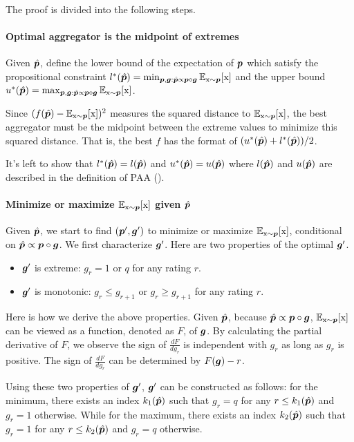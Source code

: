 
The proof is divided into the following steps. 

\paragraph{Optimal aggregator is the midpoint of extremes} Given $\hat{{\bm{p}}}$, define the lower bound of the expectation of ${\bm{p}}$ which satisfy the propositional constraint $l^*(\hat{{\bm{p}}})=\min_{{\bm{p}},{\bm{g}}:\hat{{\bm{p}}}\propto {\bm{p}}\circ{\bm{g}}}\mathbb{E}_{{\textnormal{x}}\sim{\bm{p}}}[{\textnormal{x}}]$ and the upper bound $u^*(\hat{{\bm{p}}})=\max_{{\bm{p}},{\bm{g}}:\hat{{\bm{p}}}\propto {\bm{p}}\circ{\bm{g}}}\mathbb{E}_{{\textnormal{x}}\sim{\bm{p}}}[{\textnormal{x}}]$. 

Since $(f(\hat{{\bm{p}}})-\mathbb{E}_{{\textnormal{x}}\sim{\bm{p}}}[{\textnormal{x}}])^2$ measures the squared distance to $\mathbb{E}_{{\textnormal{x}}\sim{\bm{p}}}[{\textnormal{x}}]$, the best aggregator must be the midpoint between the extreme values to minimize this squared distance. That is, the best $f$ has the format of $(u^*(\hat{{\bm{p}}})+l^*(\hat{{\bm{p}}}))/2$. 


It's left to show that $l^*(\hat{{\bm{p}}})=l(\hat{{\bm{p}}})$ and $u^*(\hat{{\bm{p}}})=u(\hat{{\bm{p}}})$ where $l(\hat{{\bm{p}}})$ and $u(\hat{{\bm{p}}})$ are described in the definition of PAA ().

\paragraph{Minimize or maximize $\mathbb{E}_{{\textnormal{x}}\sim{\bm{p}}}[{\textnormal{x}}]$ given $\hat{{\bm{p}}}$} Given $\hat{{\bm{p}}}$, we start to find $({\bm{p}}',{\bm{g}}')$ to minimize or maximize $\mathbb{E}_{{\textnormal{x}}\sim{\bm{p}}}[{\textnormal{x}}]$, conditional on $\hat{{\bm{p}}}\propto {\bm{p}}\circ{\bm{g}}$. We first characterize ${\bm{g}}'$. Here are two properties of the optimal ${\bm{g}}'$. 
\begin{itemize}
    \item ${\bm{g}}'$ is extreme: $g_r=1$ or $q$ for any rating $r$.
    \item ${\bm{g}}'$ is monotonic: $g_r\le g_{r+1}$ or $g_r\ge g_{r+1}$ for any rating $r$.
\end{itemize}

Here is how we derive the above properties. Given $\hat{{\bm{p}}}$, because $\hat{{\bm{p}}}\propto {\bm{p}}\circ{\bm{g}}$, $\mathbb{E}_{{\textnormal{x}}\sim{\bm{p}}}[{\textnormal{x}}]$ can be viewed as a function, denoted as $F$, of ${\bm{g}}$. By calculating the partial derivative of $F$, we observe the sign of $\frac{dF}{dg_r}$ is independent with $g_r$ as long as $g_r$ is positive. The sign of $\frac{dF}{dg_r}$ can be determined by $F({\bm{g}})-r$.

Using these two properties of ${\bm{g}}'$, ${\bm{g}}'$ can be constructed as follows: for the minimum, there exists an index $k_1(\hat{{\bm{p}}})$ such that $g_r=q$ for any $r\le k_1(\hat{{\bm{p}}})$ and $g_r=1$ otherwise. While for the maximum, there exists an index $k_2(\hat{{\bm{p}}})$ such that $g_r=1$ for any $r\le k_2(\hat{{\bm{p}}})$ and $g_r=q$ otherwise.

